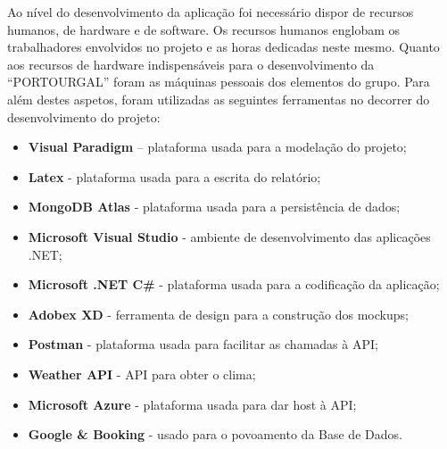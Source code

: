 Ao nível do desenvolvimento da aplicação foi necessário dispor de recursos humanos, de hardware e de software.
Os recursos humanos englobam os trabalhadores envolvidos no projeto e as horas dedicadas neste mesmo. Quanto aos recursos de hardware indispensáveis para o desenvolvimento da “PORTOURGAL” foram as máquinas pessoais dos elementos do grupo.
Para além destes aspetos, foram utilizadas as seguintes ferramentas no decorrer do desenvolvimento do projeto:
\begin{itemize}
    \item \textbf{Visual Paradigm} – plataforma usada para a modelação do projeto;
    \item \textbf{Latex} - plataforma usada para a escrita do relatório;
    \item \textbf{MongoDB Atlas} - plataforma usada para a persistência de dados;
    \item \textbf{Microsoft Visual Studio} - ambiente de desenvolvimento das aplicações .NET;
    \item \textbf{Microsoft .NET C#} - plataforma usada para a codificação da aplicação;
    \item \textbf{Adobex XD} - ferramenta de design para a construção dos mockups;
    \item \textbf{Postman} - plataforma usada para facilitar as chamadas à API;
    \item \textbf{Weather API} - API para obter o clima;
    \item \textbf{Microsoft Azure} - plataforma usada para dar host à API;
    \item \textbf{Google & Booking} - usado para o povoamento da Base de Dados.
\end{itemize}